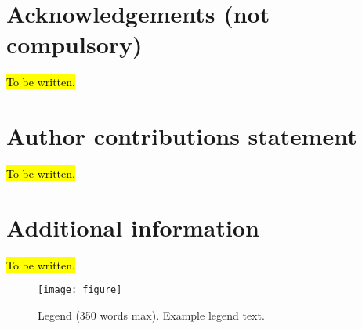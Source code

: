 \documentclass[fleqn,10pt]{wlscirep}
\begin{document}


\section*{Acknowledgements (not compulsory)}

\hl{To be written.}

\section*{Author contributions statement}

\hl{To be written.}

\section*{Additional information}

\hl{To be written.}


\begin{figure}[ht]
\centering
\texttt{[image: figure]}
\caption{Legend (350 words max). Example legend text.}
\label{fig:stream2}
\end{figure}
\end{document}
